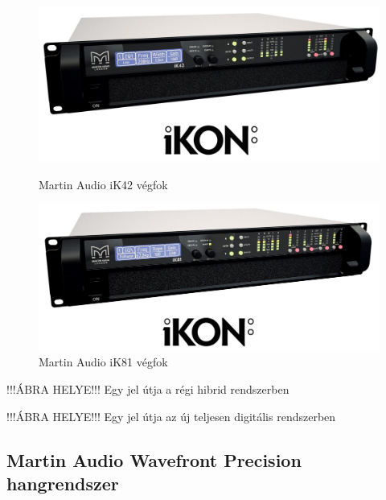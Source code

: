 \begin{figure}[H]
    \centering
    \begin{minipage}{0.45\textwidth}
        \centering
        \includegraphics[width=\linewidth, keepaspectratio]{figures/ikon_ik42.jpg}
        \caption{Martin Audio iK42 végfok}\label{fig:ikon_ik42}
    \end{minipage}\hfill
    \begin{minipage}{0.45\textwidth}
        \centering
        \includegraphics[width=\linewidth, keepaspectratio]{figures/ikon_ik81.jpg}
        \caption{Martin Audio iK81 végfok}\label{fig:ikon_ik81}
    \end{minipage}
\end{figure}

!!!ÁBRA HELYE!!! Egy jel útja a régi hibrid rendszerben

!!!ÁBRA HELYE!!! Egy jel útja az új teljesen digitális rendszerben

\subsection{Martin Audio Wavefront Precision hangrendszer}
